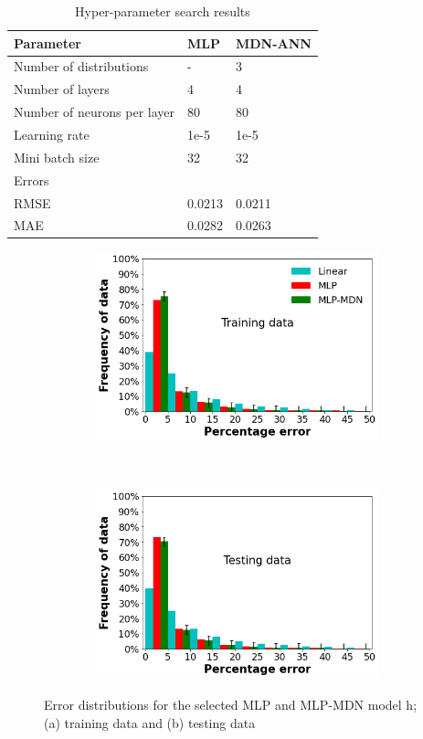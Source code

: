 \documentclass[a4paper,fleqn]{cas-sc}
\begin{document}
\begin{table}[h!]
\caption{Hyper-parameter search results}\label{tbl_hyper_results}
\begin{tabular*}{\textwidth}{lp{}l}
\toprule
 Parameter& MLP & MDN-ANN \\ %
\midrule
 Number of distributions & - & 3  \\
 Number of layers & 4 & 4\\
 Number of neurons per layer & 80  & 80\\
 Learning rate & 1e-5 &  1e-5   \\
 Mini batch size  &32 & 32  \\
\midrule
Errors & &\\
\midrule
RMSE & 0.0213 & 0.0211\\
MAE & 0.0282& 0.0263\\
\bottomrule
\end{tabular*}
\end{table}  

\begin{figure}[h!]
\centering
    \begin{subfigure}{0.5\textwidth}
    \includegraphics[width=1\textwidth, height =5.5cm]{OVERALL_TRAIN}
    \caption{}
    \end{subfigure}\\
    \begin{subfigure}{0.5\textwidth}
    \includegraphics[width=1\textwidth, height =5.5cm]{OVERALL_TEST}
    \caption{}
    \end{subfigure}
    \caption{Error distributions for the selected MLP and MLP-MDN model h; (a) training data and (b) testing data}\label{fig_frequency_data}
\end{figure}
\end{document}
